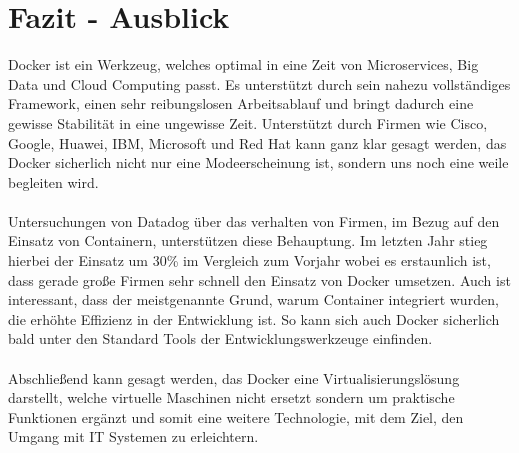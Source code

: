 \documentclass[12pt,toc=bib,toc=listof]{scrreprt}
\begin{document}
\chapter{Fazit - Ausblick} %
\label{sec:fazit}

Docker ist ein Werkzeug, welches optimal in eine Zeit von Microservices, Big Data und Cloud Computing passt.
Es unterstützt durch sein nahezu vollständiges Framework, einen sehr reibungslosen Arbeitsablauf und bringt dadurch eine gewisse Stabilität in eine ungewisse Zeit.
Unterstützt durch Firmen wie Cisco, Google, Huawei, IBM, Microsoft und Red Hat kann ganz klar gesagt werden, das Docker sicherlich nicht nur eine Modeerscheinung ist, sondern uns noch eine weile begleiten wird.\\
\\
Untersuchungen von Datadog über das verhalten von Firmen, im Bezug auf den Einsatz von Containern, unterstützen diese Behauptung.\cite{datadog}
Im letzten Jahr stieg hierbei der Einsatz um 30\% im Vergleich zum Vorjahr wobei es erstaunlich ist, dass gerade große Firmen sehr schnell den Einsatz von Docker umsetzen.
Auch ist interessant, dass der meistgenannte Grund, warum Container integriert wurden, die erhöhte Effizienz in der Entwicklung ist.
So kann sich auch Docker sicherlich bald unter den Standard Tools der Entwicklungswerkzeuge einfinden.\\
\\
Abschließend kann gesagt werden, das Docker eine Virtualisierungslösung darstellt, welche virtuelle Maschinen nicht ersetzt sondern um praktische Funktionen ergänzt und somit eine weitere Technologie, mit dem Ziel, den Umgang mit IT Systemen zu erleichtern.

\end{document}
